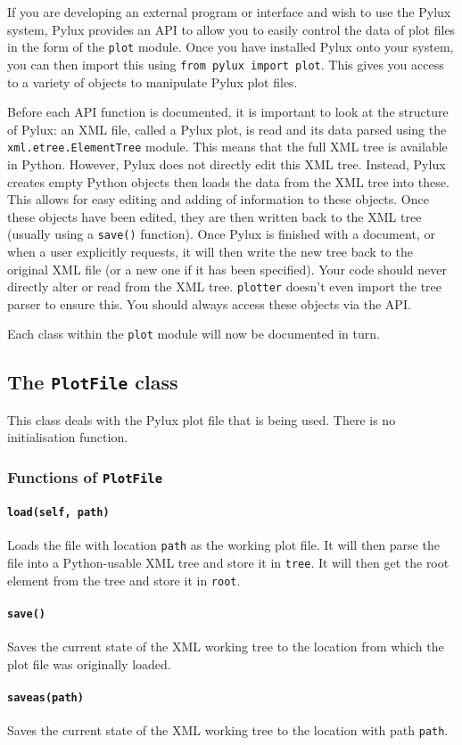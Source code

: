 \documentclass[a4paper]{article}
\begin{document}
If you are developing an external program or interface and wish to use the 
Pylux system, Pylux provides an API to allow you to easily control the data of 
plot files in the form of the \texttt{plot} module. Once you have installed 
Pylux onto your system, you can then import this using 
\texttt{from pylux import plot}. This gives you access to a variety of 
objects to manipulate Pylux plot files.

Before each API function is documented, it is important to look at the 
structure of Pylux: an XML file, called a Pylux plot, is read and its data 
parsed using the \texttt{xml.etree.ElementTree} module. This means that the 
full XML tree is available in Python. However, Pylux does not directly edit 
this XML tree. Instead, Pylux creates empty Python objects then loads the 
data from the XML tree into these. This allows for easy editing and adding of 
information to these objects. Once these objects have been edited, they are 
then written back to the XML tree (usually using a \texttt{save()} function). 
Once Pylux is finished with a document, or when a user explicitly requests, 
it will then write the new tree back to the original XML file (or a new one if 
it has been specified). Your code should never directly alter or read from 
the XML tree. \texttt{plotter} doesn't even import the tree parser to ensure 
this. You should always access these objects via the API.

Each class within the \texttt{plot} module will now be documented in turn.

\subsection{The \texttt{PlotFile} class}
This class deals with the Pylux plot file that is being used. There is no 
initialisation function.

\subsubsection{Functions of \texttt{PlotFile}}

\paragraph{\texttt{load(self, path)}}
Loads the file with location \texttt{path} as the working plot file. It will 
then parse the file into a Python-usable XML tree and store it in 
\texttt{tree}. It will then get the root element from the tree and store it in 
\texttt{root}.

\paragraph{\texttt{save()}}
Saves the current state of the XML working tree to the location from which 
the plot file was originally loaded.

\paragraph{\texttt{saveas(path)}}
Saves the current state of the XML working tree to the location with path 
\texttt{path}.
\end{document}
